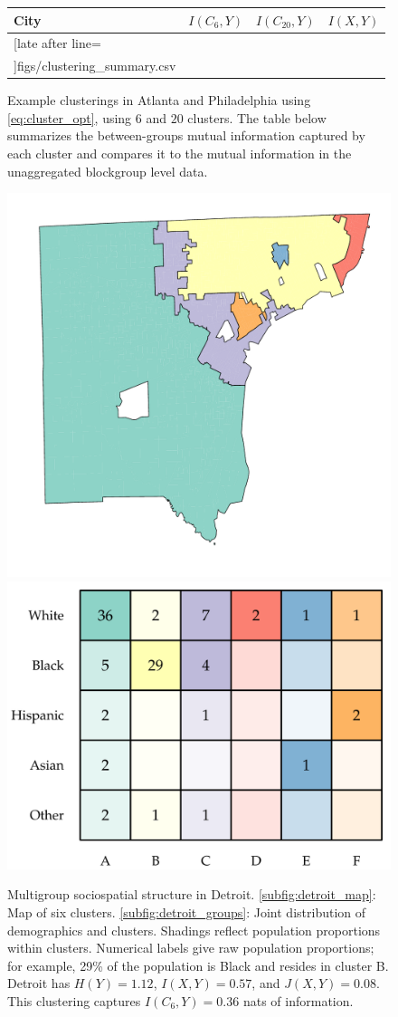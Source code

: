 \documentclass[9pt,twocolumn,twoside]{pnas-new}
\begin{document}
\begin{figure}
		\centering
		\begin{tabular}{l | c c c}
			\bfseries City  & $I(C_6, Y)$ & $I(C_{20},Y)$ & $I(X,Y)$ \\\hline
			\csvreader[late after line=\\]{figs/clustering_summary.csv}{}
			{\csvcoli & \csvcoliii & \csvcoliv & \csvcolii}
		\end{tabular}
		\caption{
			Example clusterings in Atlanta and Philadelphia using \eqref{eq:cluster_opt}, using $6$ and $20$ clusters. 
			The table below summarizes the between-groups mutual information captured by each cluster and compares it to the mutual information in the unaggregated blockgroup level data.
		} \label{fig:clusterings}

	\end{figure}

	\begin{figure}
		\centering
			\includegraphics[width = .4\linewidth]{figs/example_cluster_map.pdf}
			\includegraphics[width = .4\linewidth]{figs/example_clusters_detailed.pdf}
			\caption{
				Multigroup sociospatial structure in Detroit. 
				\ref{subfig:detroit_map}: Map of six clusters. 
				\ref{subfig:detroit_groups}: Joint distribution of demographics and clusters. 
				Shadings reflect population proportions within clusters. 
				Numerical labels give raw population proportions; for example, 29\% of the population is Black and resides in cluster B. 
				Detroit has $H(Y) = 1.12$, $I(X,Y) = 0.57$, and $J(X,Y) = 0.08$. 
				This clustering captures $I(C_6,Y) = 0.36$ nats of information.
			} \label{fig:detroit}
	\end{figure}
\end{document}
